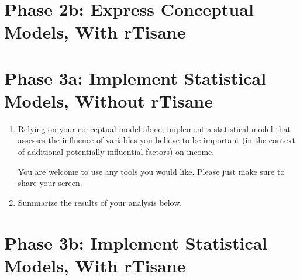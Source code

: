 \section{Phase 2b: Express Conceptual Models, With rTisane}
\clearpage

\section{Phase 3a: Implement Statistical Models, Without rTisane}
\begin{enumerate}
    \item Relying on your conceptual model alone, implement a statistical model that
    assesses the influence of variables you believe to be important (in the context
    of additional potentially influential factors) on income.

    You are welcome to use any tools you would like. Please just make sure to share
    your screen. 

    \item Summarize the results of your analysis below.
\end{enumerate}
\clearpage

\section{Phase 3b: Implement Statistical Models, With rTisane}
